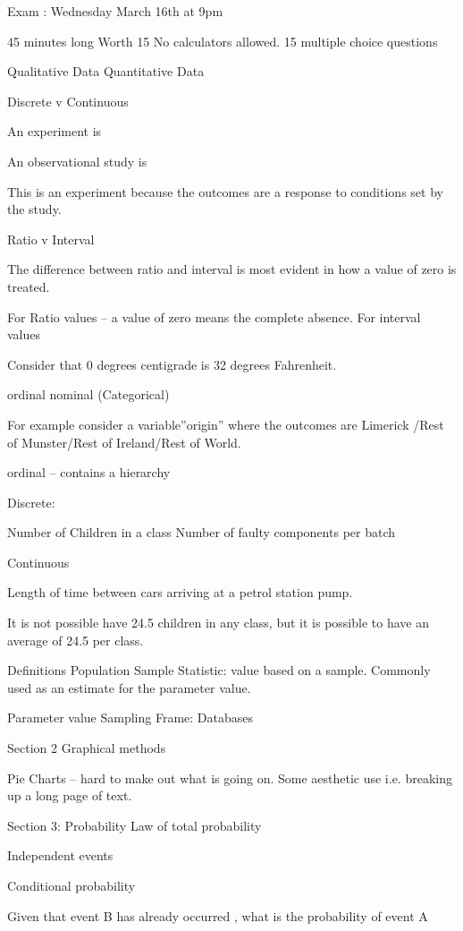  
Exam : Wednesday March 16th at 9pm
 
45 minutes long
Worth 15%
No calculators allowed.
15 multiple choice questions
 
 
Qualitative Data
Quantitative Data
 
Discrete v Continuous
 
An experiment is
 
An observational study is
 
This is an experiment because the outcomes are a response to conditions set by the study.
 
 
Ratio v Interval
 
The difference between ratio and interval is most evident in how a value of zero is treated.
 
For Ratio values – a value of zero means the complete absence.
For interval values
 
Consider that 0 degrees centigrade is 32 degrees Fahrenheit.
 
ordinal
nominal (Categorical)
 
For example consider a variable”origin” where the outcomes are Limerick /Rest of Munster/Rest of Ireland/Rest of World.
 
ordinal – contains a hierarchy
 
Discrete:
 
Number of Children in a class
Number of faulty components per batch
 
Continuous
 
Length of time between cars arriving at a petrol station pump.
 
 
It  is not possible have 24.5 children in any class, but it is possible to have an average of 24.5 per class.
 
Definitions
Population
Sample
Statistic: value based on a sample. Commonly used as an estimate for the parameter value.
 
Parameter value
Sampling Frame:
Databases
 
Section 2 Graphical methods
 
Pie Charts – hard to make out what is going on.
Some aesthetic use i.e. breaking up a long page of text.
 
Section 3: Probability
Law of total probability
 
Independent events
 
Conditional probability
 
Given that event B has already occurred ,   what is the probability of event A
 
